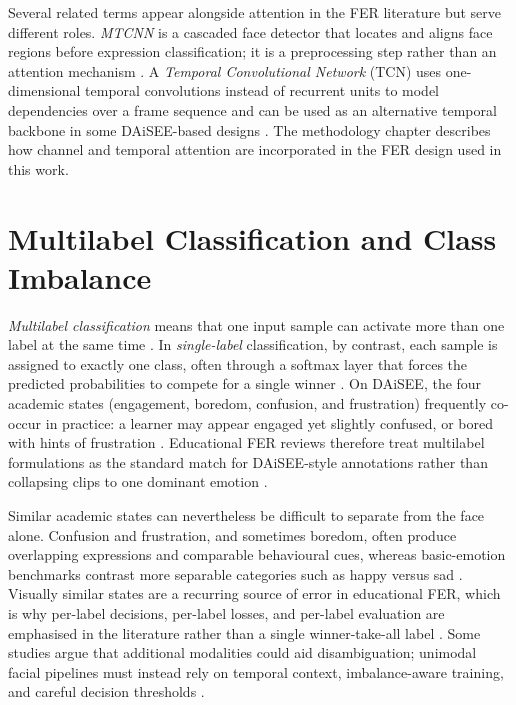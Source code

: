 Several related terms appear alongside attention in the FER literature but serve different roles. \emph{MTCNN} is a cascaded face detector that locates and aligns face regions before expression classification; it is a preprocessing step rather than an attention mechanism \cite{tulsani_realtime_2025}. A \emph{Temporal Convolutional Network} (TCN) uses one-dimensional temporal convolutions instead of recurrent units to model dependencies over a frame sequence and can be used as an alternative temporal backbone in some DAiSEE-based designs \cite{abedi_improving_2021,aly_revolutionizing_2025}. The methodology chapter describes how channel and temporal attention are incorporated in the FER design used in this work.

\section{Multilabel Classification and Class Imbalance}

\emph{Multilabel classification} means that one input sample can activate more than one label at the same time \cite{lek_academic_2023}. In \emph{single-label} classification, by contrast, each sample is assigned to exactly one class, often through a softmax layer that forces the predicted probabilities to compete for a single winner \cite{gupta_daisee_2016}. On DAiSEE, the four academic states (engagement, boredom, confusion, and frustration) frequently co-occur in practice: a learner may appear engaged yet slightly confused, or bored with hints of frustration \cite{gupta_daisee_2016,dmello_language_2012}. Educational FER reviews therefore treat multilabel formulations as the standard match for DAiSEE-style annotations rather than collapsing clips to one dominant emotion \cite{lek_academic_2023,florestiyanto_emotion_2024}.

Similar academic states can nevertheless be difficult to separate from the face alone. Confusion and frustration, and sometimes boredom, often produce overlapping expressions and comparable behavioural cues, whereas basic-emotion benchmarks contrast more separable categories such as happy versus sad \cite{dmello_language_2012,lek_academic_2023}. Visually similar states are a recurring source of error in educational FER, which is why per-label decisions, per-label losses, and per-label evaluation are emphasised in the literature rather than a single winner-take-all label \cite{gupta_daisee_2016,florestiyanto_emotion_2024}. Some studies argue that additional modalities could aid disambiguation; unimodal facial pipelines must instead rely on temporal context, imbalance-aware training, and careful decision thresholds \cite{lek_academic_2023}.


